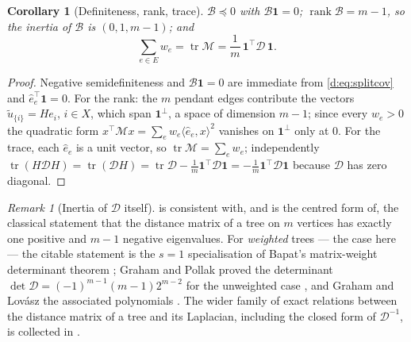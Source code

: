 \documentclass[11pt]{article}
\theoremstyle{plain}
\newtheorem{corollary}{Corollary}
\theoremstyle{definition}
\theoremstyle{remark}
\newtheorem{remark}{Remark}
\providecommand{\Dmat}{\mathcal{D}}          %
\providecommand{\Bop}{\mathcal{B}}           %
\providecommand{\Mop}{\mathcal{M}}           %
\providecommand{\1}{\mathbf{1}}
\newcommand{\ehat}{\hat{e}}
\begin{document}
\begin{corollary}[Definiteness, rank, trace]\label{d:cor:nsd}
$\Bop\preceq0$ with $\Bop\1=0$; $\operatorname{rank}\Bop=m-1$, so the inertia of
$\Bop$ is $(0,1,m-1)$; and
\begin{equation}\label{d:eq:trace}
  \sum_{e\in E}w_e=\operatorname{tr}\Mop=\frac{1}{m}\,\1^\top\Dmat\,\1 .
\end{equation}
\end{corollary}

\begin{proof}
Negative semidefiniteness and $\Bop\1=0$ are immediate from
\eqref{d:eq:splitcov} and $\ehat_e^\top\1=0$. For the rank: the $m$ pendant
edges contribute the vectors $\tilde u_{\{i\}}=He_i$, $i\in X$, which span
$\1^{\perp}$, a space of dimension $m-1$; since every $w_e>0$ the quadratic form
$x^\top\Mop x=\sum_ew_e\langle \ehat_e,x\rangle^2$ vanishes on $\1^{\perp}$ only
at $0$. For the trace, each $\ehat_e$ is a unit vector, so
$\operatorname{tr}\Mop=\sum_ew_e$; independently
$\operatorname{tr}(H\Dmat H)=\operatorname{tr}(\Dmat H)
 =\operatorname{tr}\Dmat-\tfrac1m\1^\top\Dmat\1=-\tfrac1m\1^\top\Dmat\1$
because $\Dmat$ has zero diagonal.
\end{proof}

\begin{remark}[Inertia of $\Dmat$ itself]\label{d:rem:inertia}
 is consistent with, and is the centred form of, the classical
statement that the distance matrix of a tree on $m$ vertices has exactly one
positive and $m-1$ negative eigenvalues. For \emph{weighted} trees --- the case
here --- the citable statement is the $s=1$ specialisation of Bapat's
matrix-weight determinant theorem \cite{bapat2006determinant}; Graham and
Pollak proved the determinant
$\det\Dmat=(-1)^{m-1}(m-1)2^{m-2}$ for the unweighted case
\cite{grahampollak1971addressing}, and Graham and Lov\'asz the associated
polynomials \cite{grahamlovasz1978polynomials}. The wider family of exact
relations between the distance matrix of a tree and its Laplacian, including the
closed form of $\Dmat^{-1}$, is collected in
\cite{bapat2005distance,bapat2014graphs}.
\end{remark}
\end{document}
